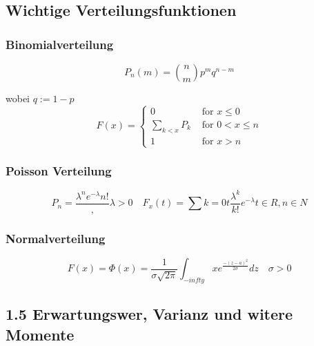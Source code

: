 \documentclass[a4paper]{article}
\theoremstyle{definition}
\theoremstyle{remark}
\begin{document}
\subsection{Wichtige Verteilungsfunktionen}
\label{sub:wichtige_verteilungsfunktionen}
\subsubsection*{Binomialverteilung}
\label{ssub:binomialverteilung}
\begin{equation}
P_n(m)= \binom{n}{m} p^mq^{n-m}
\end{equation}

 wobei $q:=1-p$\\
\begin{equation}
F(x)=
\begin{cases}
 0 		&\textrm{ for } x\leq 0\\
\sum_{k<x}P_k 	&\textrm{ for } 0<x\leq n\\
1 		&\textrm{ for  } x>n
\end{cases}
\end{equation}




\subsubsection*{Poisson Verteilung}
\label{ssub:poisson_verteilung}
\begin{equation}
P_n= \frac{\lambda ^ne^{-\lambda }{n!}}, \lambda >0 \quad F_x(t)=\sum{k=0}{t}\frac{\lambda ^k}{k!}e^{-\lambda } t\in R, n\in N
\end{equation}

\subsubsection*{Normalverteilung}
\label{ssub:normalverteilung}
\begin{equation}
F(x)=\Phi (x)=\frac{1}{\sigma \sqrt{2\pi}} \int_{-infty}{x}e^{\frac{-(z-a)^2}{2\sigma }}dz\quad \sigma >0
\end{equation}

 \subsection{1.5 Erwartungswer, Varianz und witere Momente}
\label{sub:erwartungswer_varianz_und_witere_momente}
\end{document}
